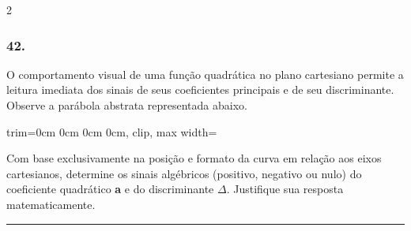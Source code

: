 \documentclass[twoside, 10pt, a4paper]{article}
\newlength{\espacoPreQuestao}
\newlength{\espacoQuestao}
\newlength{\larguraTikz}
\begin{document}
\begin{multicols*}{2}
\subsubsection*{42.} O comportamento visual de uma função quadrática no plano cartesiano permite a leitura imediata dos sinais de seus coeficientes principais e de seu discriminante. Observe a parábola abstrata representada abaixo.

\begin{center}
\begin{adjustbox}{trim=0cm 0cm 0cm 0cm, clip, max width=\larguraTikz}
\end{adjustbox}
\end{center}

Com base exclusivamente na posição e formato da curva em relação aos eixos cartesianos, determine os sinais algébricos (positivo, negativo ou nulo) do coeficiente quadrático \textbf{a} e do discriminante $\Delta$. Justifique sua resposta matematicamente.
\par\vspace{\espacoQuestao}

\noindent\textcolor{CorLinha}{\rule{\linewidth}{0.5pt}} 
\par\vspace{\espacoPreQuestao}

\end{multicols*}
\end{document}
